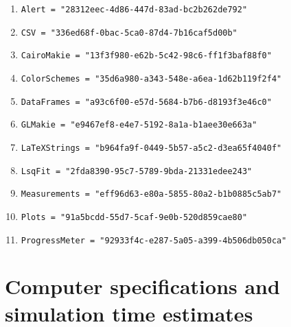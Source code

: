
\begin{enumerate}
    \item \verb+Alert = "28312eec-4d86-447d-83ad-bc2b262de792"+
    \item \verb+CSV = "336ed68f-0bac-5ca0-87d4-7b16caf5d00b"+
    \item \verb+CairoMakie = "13f3f980-e62b-5c42-98c6-ff1f3baf88f0"+ \cite{MakieJL}
    \item \verb+ColorSchemes = "35d6a980-a343-548e-a6ea-1d62b119f2f4"+
    \item \verb+DataFrames = "a93c6f00-e57d-5684-b7b6-d8193f3e46c0"+ \cite{DataFramesJL}
    \item \verb+GLMakie = "e9467ef8-e4e7-5192-8a1a-b1aee30e663a"+ \cite{MakieJL}
    \item \verb+LaTeXStrings = "b964fa9f-0449-5b57-a5c2-d3ea65f4040f"+
    \item \verb+LsqFit = "2fda8390-95c7-5789-9bda-21331edee243"+
    \item \verb+Measurements = "eff96d63-e80a-5855-80a2-b1b0885c5ab7"+ \cite{Measurements.jl-2016}
    \item \verb+Plots = "91a5bcdd-55d7-5caf-9e0b-520d859cae80"+ \cite{PlotsJL}
    \item \verb+ProgressMeter = "92933f4c-e287-5a05-a399-4b506db050ca"+
\end{enumerate}

\section{Computer specifications and simulation time estimates}

